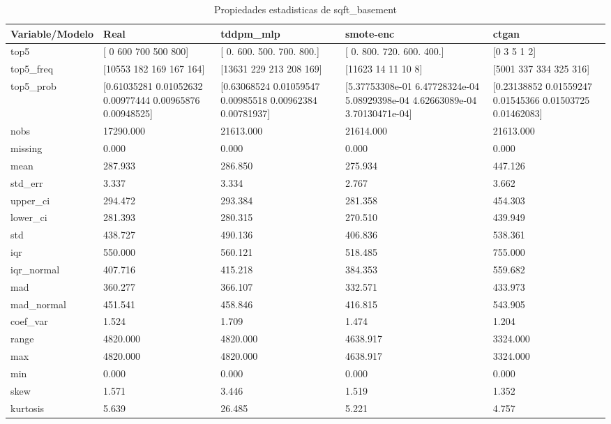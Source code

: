 \begin{table}[H]
\centering
\caption{Propiedades  estadisticas de sqft_basement}
\label{table-stats-sqft_basement}
\begin{tabular}{|l|m{10em}|m{10em}|m{10em}|m{10em}|}
\hline
 \rowcolor[gray]{0.8}
Variable/Modelo & Real & tddpm\_mlp & smote-enc & ctgan \\
\hline top5 & [  0 600 700 500 800] & [  0. 600. 500. 700. 800.] & [  0. 800. 720. 600. 400.] & [0 3 5 1 2] \\
\hline top5\_freq & [10553   182   169   167   164] & [13631   229   213   208   169] & [11623    14    11    10     8] & [5001  337  334  325  316] \\
\hline top5\_prob & [0.61035281 0.01052632 0.00977444 0.00965876 0.00948525] & [0.63068524 0.01059547 0.00985518 0.00962384 0.00781937] & [5.37753308e-01 6.47728324e-04 5.08929398e-04 4.62663089e-04
 3.70130471e-04] & [0.23138852 0.01559247 0.01545366 0.01503725 0.01462083] \\
\hline nobs & 17290.000 & 21613.000 & 21614.000 & 21613.000 \\
\hline missing & 0.000 & 0.000 & 0.000 & 0.000 \\
\hline mean & 287.933 & 286.850 & 275.934 & 447.126 \\
\hline std\_err & 3.337 & 3.334 & 2.767 & 3.662 \\
\hline upper\_ci & 294.472 & 293.384 & 281.358 & 454.303 \\
\hline lower\_ci & 281.393 & 280.315 & 270.510 & 439.949 \\
\hline std & 438.727 & 490.136 & 406.836 & 538.361 \\
\hline iqr & 550.000 & 560.121 & 518.485 & 755.000 \\
\hline iqr\_normal & 407.716 & 415.218 & 384.353 & 559.682 \\
\hline mad & 360.277 & 366.107 & 332.571 & 433.973 \\
\hline mad\_normal & 451.541 & 458.846 & 416.815 & 543.905 \\
\hline coef\_var & 1.524 & 1.709 & 1.474 & 1.204 \\
\hline range & 4820.000 & 4820.000 & 4638.917 & 3324.000 \\
\hline max & 4820.000 & 4820.000 & 4638.917 & 3324.000 \\
\hline min & 0.000 & 0.000 & 0.000 & 0.000 \\
\hline skew & 1.571 & 3.446 & 1.519 & 1.352 \\
\hline kurtosis & 5.639 & 26.485 & 5.221 & 4.757 \\

\end{tabular}
\end{table}
